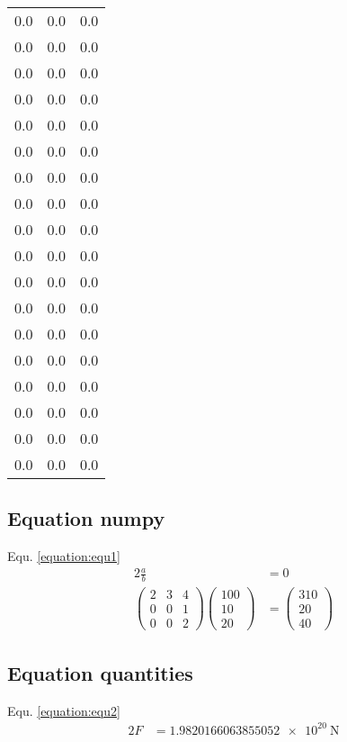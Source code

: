 \documentclass{article}%
\begin{document}
\begin{longtable}{|c|c|c|}
0.0&0.0&0.0\\%
0.0&0.0&0.0\\%
0.0&0.0&0.0\\%
0.0&0.0&0.0\\%
0.0&0.0&0.0\\%
0.0&0.0&0.0\\%
0.0&0.0&0.0\\%
0.0&0.0&0.0\\%
0.0&0.0&0.0\\%
0.0&0.0&0.0\\%
0.0&0.0&0.0\\%
0.0&0.0&0.0\\%
0.0&0.0&0.0\\%
0.0&0.0&0.0\\%
0.0&0.0&0.0\\%
0.0&0.0&0.0\\%
0.0&0.0&0.0\\%
0.0&0.0&0.0\\%
\end{longtable}

%
\subsection{Equation numpy}%
\label{subsec:Equationnumpy}%
Equ. \ref{equation:equ1}%
\begin{alignat}{2}%
\frac{a}{b} &= 0 \\%
\begin{pmatrix}%
2&3&4\\%
0&0&1\\%
0&0&2%
\end{pmatrix}%
\begin{pmatrix}%
100\\%
10\\%
20%
\end{pmatrix}%
&=%
\begin{pmatrix}%
310\\%
20\\%
40%
\end{pmatrix}%
\label{equation:equ1}%
\end{alignat}

%
\subsection{Equation quantities}%
\label{subsec:Equationquantities}%
Equ. \ref{equation:equ2}%
\begin{alignat}{2}%
F%
&=%
\SI[round-precision=4,round-mode=figures]{1.9820166063855052e+20}{\newton}%
\label{equation:equ2}%
\end{alignat}
\end{document}
